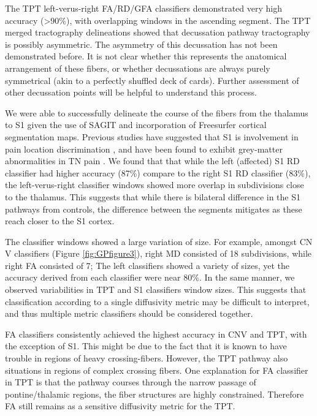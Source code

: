 The TPT left-verus-right FA/RD/GFA classifiers demonstrated very high accuracy (\textgreater 90\%), with overlapping windows in the ascending segment. The TPT merged tractography delineations showed that decussation pathway tractography is possibly asymmetric. The asymmetry of this decussation has not been demonstrated before. It is not clear whether this represents the anatomical arrangement of these fibers, or whether decussations are always purely symmetrical (akin to a perfectly shuffled deck of cards). Further assessment of other decussation points will be helpful to understand this process.  

We were able to successfully delineate the course of the fibers from the thalamus to S1 given the use of SAGIT and incorporation of Freesurfer cortical segmentation maps. Previous studies have suggested that S1 is involvement in pain location discrimination \cite{bushnell1999pain}, and have been found to exhibit grey-matter abnormalities in TN pain \cite{Desouza2013c}. We found that that while the left (affected) S1 RD classifier had higher accuracy (87\%) compare to the right S1 RD classifier (83\%), the left-verus-right classifier windows showed more overlap in subdivisions close to the thalamus. This suggests that while there is bilateral difference in the S1 pathways from controls, the difference between the segments mitigates as these reach closer to the S1 cortex.


The classifier windows showed a large variation of size. For example, amongst CN V classifiers (Figure \ref{fig:GPfigure3}), right MD consisted of 18 subdivisions, while right FA consisted of 7; The left classifiers showed a variety of sizes, yet the accuracy derived from each classifier were near 80\%. In the same manner, we observed variabilities in TPT and S1 classifiers window sizes. This suggests that classification according to a single diffusivity metric may be difficult to interpret, and thus multiple metric classifiers should be considered together. 

FA classifiers consistently achieved the highest accuracy in CNV and TPT, with the exception of S1. This might be due to the fact that it is known to have trouble in regions of heavy crossing-fibers. However, the TPT pathway also situations in regions of complex crossing fibers. One explanation for FA classifier in TPT is that the pathway courses through the narrow passage of pontine/thalamic regions, the fiber structures are highly constrained. Therefore FA still remains as a sensitive diffusivity metric for the TPT. 

